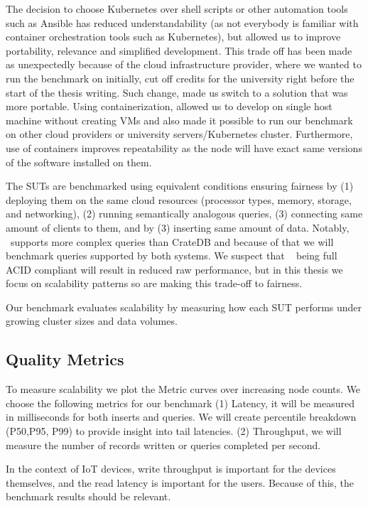 The decision to choose Kubernetes over shell scripts or other automation tools such as Ansible has reduced understandability (as not everybody is familiar with container orchestration tools such as Kubernetes), but allowed us to improve portability, relevance and simplified development.
This trade off has been made as unexpectedly because of the cloud infrastructure provider, where we wanted to run the benchmark on initially, cut off credits for the university right before the start of the thesis writing.
Such change, made us switch to a solution that was more portable. 
Using containerization, allowed us to develop on single host machine without creating VMs and also made it possible to run our benchmark on other cloud providers or university servers/Kubernetes cluster.
Furthermore, use of containers improves repeatability as the node will have exact same versions of the software installed on them.

The SUTs are benchmarked using equivalent conditions ensuring fairness by 
(1) deploying them on the same cloud resources (processor types, memory, storage, and networking),
(2) running semantically analogous queries,
(3) connecting same amount of clients to them, and by
(3) inserting same amount of data.
Notably, \mobilitydbc~supports more complex queries than CrateDB and because of that we will benchmark queries supported by both systems.
We suspect that \mobilitydbc~ being full ACID compliant will result in reduced raw performance, but in this thesis we focus on scalability patterns so are making this trade-off to fairness.

Our benchmark evaluates scalability by measuring how each SUT performs under growing cluster sizes and data volumes.

\subsection{Quality Metrics}
To measure scalability we plot the Metric curves over increasing node counts.
We choose the following metrics for our benchmark
(1) Latency, it will be measured in milliseconds for both inserts and queries. We will create percentile breakdown (P50,P95, P99) to provide insight into tail latencies.
(2) Throughput, we will measure the number of records written or queries completed per second.

In the context of IoT devices, write throughput is important for the devices themselves, and the read latency is important for the users.
Because of this, the benchmark results should be relevant.

